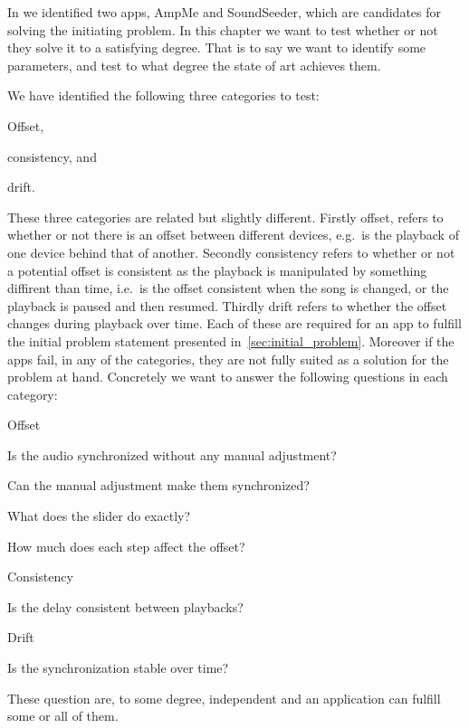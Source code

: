 In  we identified two apps, AmpMe and SoundSeeder, which are candidates for solving the initiating problem.
In this chapter we want to test whether or not they solve it to a satisfying degree.
That is to say we want to identify some parameters, and test to what degree the state of art achieves them.

We have identified the following three categories to test:
\begin{eletterate*}
    \item Offset,
    \item consistency, and
    \item drift.
\end{eletterate*}

These three categories are related but slightly different.
Firstly offset, refers to whether or not there is an offset between different devices, e.g.\ is the playback of one device behind that of another.
Secondly consistency refers to whether or not a potential offset is consistent as the playback is manipulated by something diffirent than time, i.e.\ is the offset consistent when the song is changed, or the playback is paused and then resumed.
Thirdly drift refers to whether the offset changes during playback over time.
Each of these are required for an app to fulfill the initial problem statement presented in~\cref{sec:initial_problem}.
Moreover if the apps fail, in any of the categories, they are not fully suited as a solution for the problem at hand.
Concretely we want to answer the following questions in each category:
\begin{eletterate}
    \item Offset
    \begin{enumberate}
        \item Is the audio synchronized without any manual adjustment?
        \item Can the manual adjustment make them synchronized?
        \begin{enumberate}
            \item What does the slider do exactly?
            \item How much does each step affect the offset?
        \end{enumberate}
    \end{enumberate}
    \item Consistency
    \begin{enumberate}[resume]
        \item Is the delay consistent between playbacks?
    \end{enumberate}
    \item Drift
    \begin{enumberate}[resume]
        \item Is the synchronization stable over time?
    \end{enumberate}
\end{eletterate}

These question are, to some degree, independent and an application can fulfill some or all of them.

